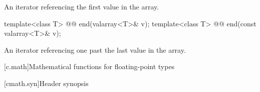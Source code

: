 \begin{itemdescr}
\pnum
\returns
An iterator referencing the first value in the array.
\end{itemdescr}

%
\begin{itemdecl}
template<class T> @@ end(valarray<T>& v);
template<class T> @@ end(const valarray<T>& v);
\end{itemdecl}

\begin{itemdescr}
\pnum
\returns
An iterator referencing one past the last value in the array.
\end{itemdescr}

[c.math]{Mathematical functions for floating-point types}

[cmath.syn]{Header  synopsis}

